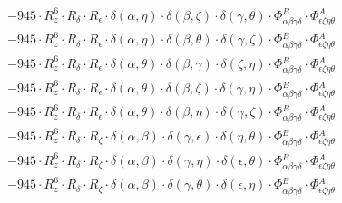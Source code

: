 \documentclass{article}
\begin{document}
\begin{equation}
\begin{array}{c}
 \\[0.2em] 		 - 945 \cdot R_{z}^{6} \cdot R_{\delta{}} \cdot R_{\epsilon{}} \cdot \delta{}\left(\alpha{}, \eta{}\right) \cdot \delta{}\left(\beta{}, \zeta{}\right) \cdot \delta{}\left(\gamma{}, \theta{}\right) \cdot \Phi{}^{B}_{\alpha{}\beta{}\gamma{}\delta{}} \cdot \Phi{}^{A}_{\epsilon{}\zeta{}\eta{}\theta{}} 
 \\[0.2em] 		 - 945 \cdot R_{z}^{6} \cdot R_{\delta{}} \cdot R_{\epsilon{}} \cdot \delta{}\left(\alpha{}, \eta{}\right) \cdot \delta{}\left(\beta{}, \theta{}\right) \cdot \delta{}\left(\gamma{}, \zeta{}\right) \cdot \Phi{}^{B}_{\alpha{}\beta{}\gamma{}\delta{}} \cdot \Phi{}^{A}_{\epsilon{}\zeta{}\eta{}\theta{}} 
 \\[0.2em] 		 - 945 \cdot R_{z}^{6} \cdot R_{\delta{}} \cdot R_{\epsilon{}} \cdot \delta{}\left(\alpha{}, \theta{}\right) \cdot \delta{}\left(\beta{}, \gamma{}\right) \cdot \delta{}\left(\zeta{}, \eta{}\right) \cdot \Phi{}^{B}_{\alpha{}\beta{}\gamma{}\delta{}} \cdot \Phi{}^{A}_{\epsilon{}\zeta{}\eta{}\theta{}} 
 \\[0.2em] 		 - 945 \cdot R_{z}^{6} \cdot R_{\delta{}} \cdot R_{\epsilon{}} \cdot \delta{}\left(\alpha{}, \theta{}\right) \cdot \delta{}\left(\beta{}, \zeta{}\right) \cdot \delta{}\left(\gamma{}, \eta{}\right) \cdot \Phi{}^{B}_{\alpha{}\beta{}\gamma{}\delta{}} \cdot \Phi{}^{A}_{\epsilon{}\zeta{}\eta{}\theta{}} 
 \\[0.2em] 		 - 945 \cdot R_{z}^{6} \cdot R_{\delta{}} \cdot R_{\epsilon{}} \cdot \delta{}\left(\alpha{}, \theta{}\right) \cdot \delta{}\left(\beta{}, \eta{}\right) \cdot \delta{}\left(\gamma{}, \zeta{}\right) \cdot \Phi{}^{B}_{\alpha{}\beta{}\gamma{}\delta{}} \cdot \Phi{}^{A}_{\epsilon{}\zeta{}\eta{}\theta{}} 
 \\[0.2em] 		 - 945 \cdot R_{z}^{6} \cdot R_{\delta{}} \cdot R_{\zeta{}} \cdot \delta{}\left(\alpha{}, \beta{}\right) \cdot \delta{}\left(\gamma{}, \epsilon{}\right) \cdot \delta{}\left(\eta{}, \theta{}\right) \cdot \Phi{}^{B}_{\alpha{}\beta{}\gamma{}\delta{}} \cdot \Phi{}^{A}_{\epsilon{}\zeta{}\eta{}\theta{}} 
 \\[0.2em] 		 - 945 \cdot R_{z}^{6} \cdot R_{\delta{}} \cdot R_{\zeta{}} \cdot \delta{}\left(\alpha{}, \beta{}\right) \cdot \delta{}\left(\gamma{}, \eta{}\right) \cdot \delta{}\left(\epsilon{}, \theta{}\right) \cdot \Phi{}^{B}_{\alpha{}\beta{}\gamma{}\delta{}} \cdot \Phi{}^{A}_{\epsilon{}\zeta{}\eta{}\theta{}} 
 \\[0.2em] 		 - 945 \cdot R_{z}^{6} \cdot R_{\delta{}} \cdot R_{\zeta{}} \cdot \delta{}\left(\alpha{}, \beta{}\right) \cdot \delta{}\left(\gamma{}, \theta{}\right) \cdot \delta{}\left(\epsilon{}, \eta{}\right) \cdot \Phi{}^{B}_{\alpha{}\beta{}\gamma{}\delta{}} \cdot \Phi{}^{A}_{\epsilon{}\zeta{}\eta{}\theta{}} 

\end{array}
\end{equation}
\end{document}
